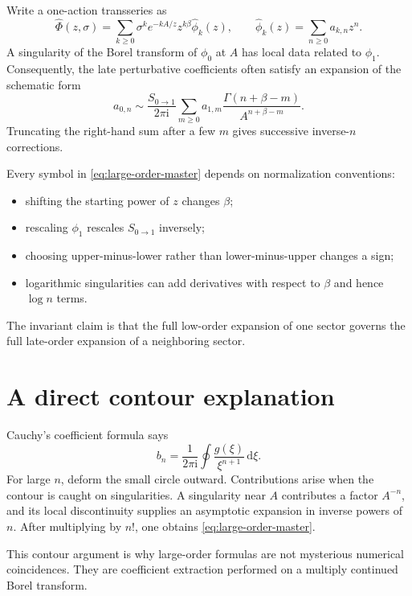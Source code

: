 \documentclass[11pt,openany]{book}
\theoremstyle{definition}
\theoremstyle{plain}
\theoremstyle{remark}
\newcommand{\dd}{\,\mathrm{d}}
\newcommand{\ii}{\mathrm{i}}
\newcommand{\trans}[1]{\widehat{#1}}
\begin{document}
Write a one-action transseries as
\begin{equation}\label{eq:resurgent-one-action}
 \trans\Phi(z,\sigma)
 =\sum_{k\ge0}\sigma^ke^{-kA/z}z^{k\beta}
 \trans\phi_k(z),
 \qquad
 \trans\phi_k(z)=\sum_{n\ge0}a_{k,n}z^n.
\end{equation}
A singularity of the Borel transform of $\phi_0$ at $A$ has local data related to $\phi_1$. Consequently, the late perturbative coefficients often satisfy an expansion of the schematic form
\begin{equation}\label{eq:large-order-master}
 a_{0,n}\sim
 \frac{S_{0\to1}}{2\pi\ii}
 \sum_{m\ge0}a_{1,m}
 \frac{\Gamma(n+\beta-m)}{A^{n+\beta-m}}.
\end{equation}
Truncating the right-hand sum after a few $m$ gives successive inverse-$n$ corrections.

Every symbol in \eqref{eq:large-order-master} depends on normalization conventions:
\begin{itemize}
 \item shifting the starting power of $z$ changes $\beta$;
 \item rescaling $\phi_1$ rescales $S_{0\to1}$ inversely;
 \item choosing upper-minus-lower rather than lower-minus-upper changes a sign;
 \item logarithmic singularities can add derivatives with respect to $\beta$ and hence $\log n$ terms.
\end{itemize}
The invariant claim is that the full low-order expansion of one sector governs the full late-order expansion of a neighboring sector.

\section{A direct contour explanation}

Cauchy's coefficient formula says
\[
 b_n=\frac1{2\pi\ii}\oint\frac{g(\xi)}{\xi^{n+1}}\dd\xi.
\]
For large $n$, deform the small circle outward. Contributions arise when the contour is caught on singularities. A singularity near $A$ contributes a factor $A^{-n}$, and its local discontinuity supplies an asymptotic expansion in inverse powers of $n$. After multiplying by $n!$, one obtains \eqref{eq:large-order-master}.

This contour argument is why large-order formulas are not mysterious numerical coincidences. They are coefficient extraction performed on a multiply continued Borel transform.
\end{document}
